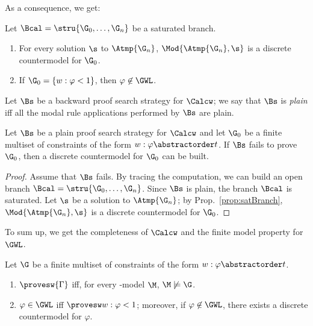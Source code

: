 \noindent
As a consequence, we get:
\begin{proposition}\label{prop:satBranch}
  Let $\Bcal=\stru{\G_0,\dots,\G_n}$ be a saturated branch.
  \begin{enumerate}[label=(\roman*), ref=(\roman*),leftmargin=*]
  \item\label{prop:satBranch:1} For every solution  $\s$  to
    $\Atmp{\G_n}$, $\Mod{\Atmp{\G_n},\s}$ is a discrete
    countermodel for $\G_0$.
      
  \item\label{prop:satBranch:2} If $\G_0=\{ w : \varphi < 1\}$, then
    $\varphi\not\in\GWL$.
  \end{enumerate}
\end{proposition}

\noindent
Let $\Bs$ be a backward proof search strategy for $\Calcw$; we say
that $\Bs$ is \emph{plain} iff all the modal rule applications
performed by $\Bs$ are plain.


\begin{lemma}\label{lemma:search}
  Let $\Bs$ be a plain proof search strategy for $\Calcw$ and let
  $\G_0$ be a finite multiset of constraints of the form
  $w:\varphi\abstractorder t$.  If $\Bs$ fails to prove $\G_0$, then a
  discrete countermodel for $\G_0$ can be built.
\end{lemma}

\begin{proof}
  Assume that $\Bs$ fails.  By tracing the computation, we can build
  an open branch $\Bcal=\stru{\G_0,\dots,\G_n}$.  Since $\Bs$ is
  plain, the branch $\Bcal$ is saturated.
Let $\s$ be  a solution to $\Atmp{\G_n}$;
by Prop.~\ref{prop:satBranch}, 
  $\Mod{\Atmp{\G_n},\s}$ is a discrete countermodel for $\G_0$.
\end{proof}

\noindent
To sum up, we get the completeness of $\Calcw$ and the finite model property for $\GWL$.



\begin{proposition}[Completeness]\label{prop:compl}
  Let $\G$  be a finite multiset of constraints of the form $w:\varphi\abstractorder t$.
  \begin{enumerate}[label=(\roman*), ref=(\roman*),leftmargin=*]    
 \item\label{prop:compl:1}
 $\provesw{\Gamma}$ iff, for every \GWM-model  $\M$,  $\M\not\models\G$.

     
\item\label{prop:compl2}
$\varphi\in\GWL$ iff  $\provesw w:\varphi < 1$; moreover, if
$\varphi\not\in\GWL$, 
there exists a discrete countermodel for $\varphi$.



\end{enumerate}
\end{proposition}

